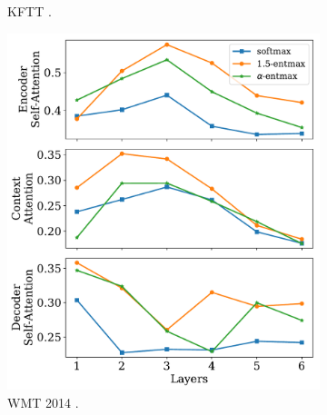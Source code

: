 \begin{figure}[!htbp]
\begin{subfigure}[b]{.49\linewidth}
        \caption{%
            \label{fig:js_divs_ja}%
            KFTT .}
    \end{subfigure}

    \begin{subfigure}[b]{.49\linewidth}
        \includegraphics[width=\linewidth]{Figures/js_divs.pdf}
        \caption{%
            \label{fig:js_divs_en}%
            WMT 2014 .}
    \end{subfigure}
    \begin{subfigure}[b]{.49\linewidth}

\end{subfigure}
\end{figure}
